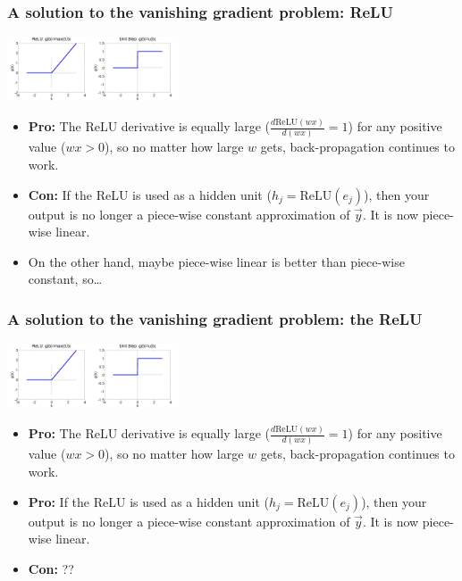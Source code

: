 \documentclass{beamer}
\begin{document}
\begin{frame}
  \frametitle{A solution to the vanishing gradient problem: ReLU}
  \centerline{\includegraphics[width=1in]{figs/nn_relu.png}\includegraphics[width=1in]{figs/nn_unitstep.png}}

  \begin{itemize}
    \item {\bf Pro:} The ReLU derivative is equally large
      ($\frac{d\mbox{ReLU}(wx)}{d(wx)}=1$) for any positive value
      ($wx>0$), so no matter how large $w$ gets, back-propagation
      continues to work.
    \item {\bf Con:} If the ReLU is used as a hidden unit
      ($h_j=\mbox{ReLU}(e_j)$), then your output is no longer a
      piece-wise constant approximation of $\vec{y}$.  It is now
      piece-wise linear.
    \item On the other hand, maybe piece-wise linear is
      better than piece-wise constant, so\ldots
  \end{itemize}
\end{frame}
      
\begin{frame}
  \frametitle{A solution to the vanishing gradient problem: the ReLU}
  \centerline{\includegraphics[width=1in]{figs/nn_relu.png}\includegraphics[width=1in]{figs/nn_unitstep.png}}

  \begin{itemize}
    \item {\bf Pro:} The ReLU derivative is equally large
      ($\frac{d\mbox{ReLU}(wx)}{d(wx)}=1$) for any positive value
      ($wx>0$), so no matter how large $w$ gets, back-propagation
      continues to work.
    \item {\bf Pro:} If the ReLU is used as a hidden unit
      ($h_j=\mbox{ReLU}(e_j)$), then your output is no longer a
      piece-wise constant approximation of $\vec{y}$.  It is now
      piece-wise linear.
    \item {\bf Con:} ??
  \end{itemize}
\end{frame}
\end{document}
